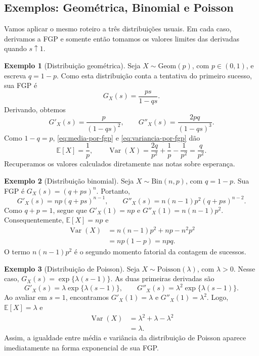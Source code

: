 \documentclass[12pt,portuguese]{article}
\theoremstyle{definition}
\newtheorem{example}[example]{Exemplo}
\theoremstyle{plainexercise}
\theoremstyle{starredexercise}
\theoremstyle{definition}
\begin{document}
\subsection{Exemplos: Geométrica, Binomial e Poisson}
\label{sec:exemplos-momentos-fgp}

Vamos aplicar o mesmo roteiro a três distribuições usuais. Em cada caso,
derivamos a FGP e somente então tomamos os valores limites das derivadas quando
$s\uparrow1$.

\begin{example}[Distribuição geométrica]\label{ex:momentos-geometrica-fgp}
Seja $X\sim\mathrm{Geom}(p)$, com $p\in(0,1)$, e escreva $q=1-p$. Como esta
distribuição conta a tentativa do primeiro sucesso, sua FGP é
\[
G_X(s)= \frac{ps}{1-qs}.
\] 
Derivando, obtemos
\[
G'_X(s)=\frac{p}{(1-qs)^2},
\qquad
G''_X(s)=\frac{2pq}{(1-qs)^3}.
\]
Como $1-q=p$, \eqref{eq:media-por-fgp} e \eqref{eq:variancia-por-fgp} dão
\[
\mathbb{E}[X]=\frac{1}{p},
\qquad
\operatorname{Var}(X)=\frac{2q}{p^2}+\frac{1}{p}-\frac{1}{p^2}
=\frac{q}{p^2}.
\]
Recuperamos os valores calculados diretamente nas notas sobre esperança.
\end{example}

\begin{example}[Distribuição binomial]\label{ex:momentos-binomial-fgp}
Seja $X\sim\mathrm{Bin}(n,p)$, com $q=1-p$. Sua FGP é
$G_X(s)=(q+ps)^n$. Portanto,
\[
G'_X(s)=np(q+ps)^{n-1},
\qquad
G''_X(s)=n(n-1)p^2(q+ps)^{n-2}.
\]
Como $q+p=1$, segue que $G'_X(1)=np$ e
$G''_X(1)=n(n-1)p^2$. Consequentemente, $\mathbb{E}[X]=np$ e
\begin{align*}
\operatorname{Var}(X)
&=n(n-1)p^2+np-n^2p^2
\\[0.2cm]
&=np(1-p)=npq.
\end{align*}
O termo $n(n-1)p^2$ é o segundo momento fatorial da contagem de sucessos.
\end{example}

\begin{example}[Distribuição de Poisson]\label{ex:momentos-poisson-fgp}
Seja $X\sim\mathrm{Poisson}(\lambda)$, com $\lambda>0$. Nesse caso,
$G_X(s)=\exp\{\lambda(s-1)\}$. As duas primeiras derivadas são
\[
G'_X(s)=\lambda\exp\{\lambda(s-1)\},
\qquad
G''_X(s)=\lambda^2\exp\{\lambda(s-1)\}.
\]
Ao avaliar em $s=1$, encontramos $G'_X(1)=\lambda$ e
$G''_X(1)=\lambda^2$. Logo, $\mathbb{E}[X]=\lambda$ e
\begin{align*}
\operatorname{Var}(X)
&=\lambda^2+\lambda-\lambda^2
\\[0.2cm]
&=\lambda.
\end{align*}
Assim, a igualdade entre média e variância da distribuição de Poisson aparece
imediatamente na forma exponencial de sua FGP.
\end{example}
\end{document}
